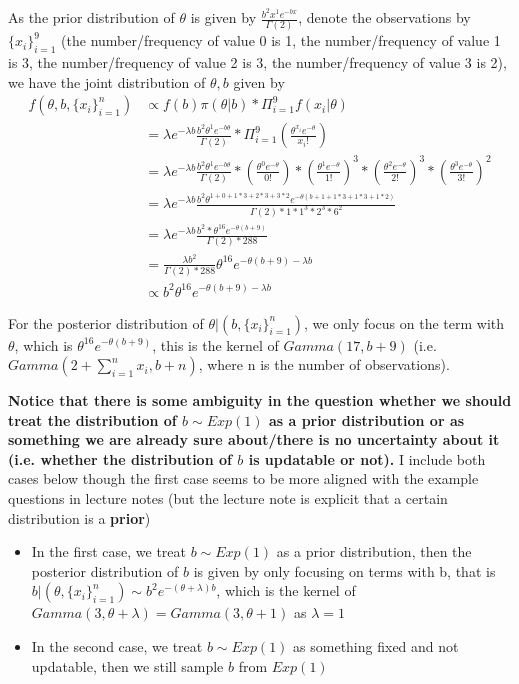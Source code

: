 \documentclass{homeworg}
\begin{document}
As the prior distribution of $\theta$ is given by $\frac{b^2x^1e^{-bx}}{\Gamma(2)}$, denote the observations by $\{x_i\}_{i=1}^9$ (the number/frequency of value 0 is 1, the number/frequency of value 1 is 3, the number/frequency of value 2 is 3, the number/frequency of value 3 is 2), we have the joint distribution of $\theta,b$ given by 
\begin{align*}
f(\theta,b,\{x_i\}_{i=1}^n)&\propto f(b)\pi(\theta|b)*\Pi_{i=1}^9f(x_i|\theta)\\
&=\lambda e^{-\lambda b} \frac{b^2\theta ^1e^{-b\theta}}{\Gamma(2)}*\Pi_{i=1}^9(\frac{\theta^{x_i}e^{-\theta}}{x_i!})\\
&=\lambda e^{-\lambda b}\frac{b^2\theta ^1e^{-b\theta}}{\Gamma(2)}*(\frac{\theta^{0}e^{-\theta}}{0!})*(\frac{\theta^{1}e^{-\theta}}{1!})^3*(\frac{\theta^{2}e^{-\theta}}{2!})^3*(\frac{\theta^{3}e^{-\theta}}{3!})^2\\
&=\lambda e^{-\lambda b}\frac{b^2\theta^{1+0+1*3+2*3+3*2}e^{-\theta(b+1+1*3+1*3+1*2)}}{\Gamma(2)*1*1^3*2^3*6^2}\\
&=\lambda e^{-\lambda b}\frac{b^2*\theta^{16}e^{-\theta(b+9)}}{\Gamma(2)*288}\\
&=\frac{\lambda b^2}{\Gamma(2)*288} \theta^{16}e^{-\theta(b+9)-\lambda b}\\
&\propto b^2 \theta^{16}e^{-\theta(b+9)-\lambda b}
\end{align*}

For the posterior distribution of $\theta|(b,\{x_i\}_{i=1}^n)$, we only focus on the term with $\theta$, which is $\theta^{16}e^{-\theta(b+9)}$, this is the kernel of $Gamma(17,b+9)$ (i.e. $Gamma(2+\sum_{i=1}^{n}x_i,b+n)$, where n is the number of observations). 

\textbf{Notice that there is some ambiguity in the question whether we should treat the distribution of $b\sim Exp(1)$ as a prior distribution or as something we are already sure about/there is no uncertainty about it (i.e. whether the distribution of $b$ is updatable or not).} I include both cases below though the first case seems to be more aligned with the example questions in lecture notes (but the lecture note is explicit that a certain distribution is a \textbf{prior})

\begin{itemize}
\item In the first case, we treat $b\sim Exp(1)$ as a prior distribution, then the posterior distribution of $b$ is given by only focusing on terms with b, that is $b|(\theta,\{x_i\}_{i=1}^n)\sim b^2e^{-(\theta+\lambda)b}$, which is the kernel of $Gamma(3,\theta+\lambda)=Gamma(3,\theta+1)$ as $\lambda=1$
\item In the second case, we treat $b\sim Exp(1)$ as something fixed and not updatable, then we still sample $b$ from $Exp(1)$
\end{itemize}
\end{document}
